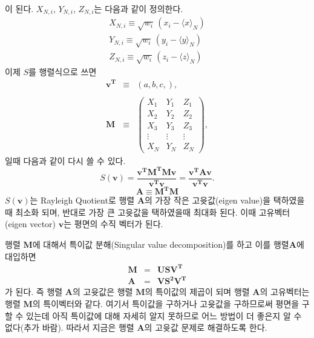 \documentclass[chapter,a4paper,10pt]{oblivoir}
\begin{document}
이 된다. $X_{N,i}$, $Y_{N,i}$, $Z_{N,i}$는 다음과 같이 정의한다.
\begin{eqnarray}
X_{N,i} \equiv \sqrt{w_i}\,(x_i - \langle x \rangle_N)\\
Y_{N,i} \equiv \sqrt{w_i}\,(y_i - \langle y \rangle_N)\\
Z_{N,i} \equiv \sqrt{w_i}\,(z_i - \langle z \rangle_N)
\end{eqnarray}
이제 $S$를 행렬식으로 쓰면
\begin{eqnarray}
\mathbf{v^T} &\equiv& (a,b,c,), \\\nonumber\\
\mathbf{M}   &\equiv& \left( \begin{array}{ccc}
  X_1 & Y_1 & Z_1 \\
  X_2 & Y_2 & Z_2 \\
  X_3 & Y_3 & Z_3 \\
  \vdots & \vdots & \vdots \\
  X_N & Y_N & Z_N
\end{array} \right),
\end{eqnarray}
일때 다음과 같이 다시 쓸 수 있다.
\begin{equation} \label{S_matrixform}
S(\mathbf v) = \frac{\mathbf{v^T}\mathbf{M^T}\mathbf{M}\mathbf{v}}{\mathbf{v^T}\mathbf{v}}
             = \frac{\mathbf{v^T}\mathbf{A}\mathbf{v}}{\mathbf{v^T}\mathbf{v}}.
\end{equation}
\begin{equation}
\mathbf{A}\equiv\mathbf{M^T}\mathbf{M}
\end{equation}
$S(\mathbf{v})$는 Rayleigh Quotient로 행렬 $\mathbf{A}$의
가장 작은 고윳값(eigen value)을 택하였을때 최소화 되며, 반대로 가장 큰 고윳값을 택하였을때 최대화 된다.
이때 고유벡터(eigen vector) $\mathbf v$는 평면의 수직 벡터가 된다.

행렬 $\mathbf{M}$에 대해서 특이값 분해(Singular value decomposition)를 하고 이를 행렬$\mathbf{A}$에
대입하면
\begin{eqnarray}
\mathbf{M}&=&\mathbf{U}\mathbf{S}\mathbf{V^T} \\
\mathbf{A}&=&\mathbf{V}\mathbf{S^2}\mathbf{V^T} \label{def_A}
\end{eqnarray}
가 된다. 즉 행렬 $\mathbf{A}$의 고윳값은 행렬 $\mathbf{M}$의 특이값의 제곱이 되며
행렬 $\mathbf{A}$의 고유벡터는 행렬 $\mathbf{M}$의 특이벡터와 같다.
여기서 특이값을 구하거나 고윳값을 구하므로써 평면을 구할 수 있는데 아직 특이값에 대해 자세히 알지 못하므로
어느 방법이 더 좋은지 알 수 없다(추가 바람).
따라서 지금은 행렬 $\mathbf{A}$의 고윳값 문제로 해결하도록 한다.
\end{document}
